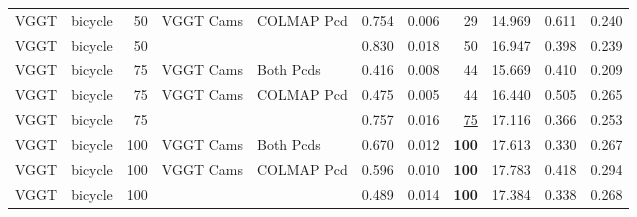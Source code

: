 \begin{table}[H]
\begin{tabular}{llrllrrrrrr}
VGGT & bicycle & 50 & VGGT Cams & COLMAP Pcd & 0.754 & 0.006 & 29 & 14.969 & 0.611 & 0.240 \\
VGGT & bicycle & 50 &  &  & 0.830 & 0.018 & 50 & 16.947 & 0.398 & 0.239 \\
VGGT & bicycle & 75 & VGGT Cams & Both Pcds & 0.416 & 0.008 & 44 & 15.669 & 0.410 & 0.209 \\
VGGT & bicycle & 75 & VGGT Cams & COLMAP Pcd & 0.475 & 0.005 & 44 & 16.440 & 0.505 & 0.265 \\
VGGT & bicycle & 75 &  &  & 0.757 & 0.016 & \underline{75} & 17.116 & 0.366 & 0.253 \\
VGGT & bicycle & 100 & VGGT Cams & Both Pcds & 0.670 & 0.012 & \textbf{100} & 17.613 & 0.330 & 0.267 \\
VGGT & bicycle & 100 & VGGT Cams & COLMAP Pcd & 0.596 & 0.010 & \textbf{100} & 17.783 & 0.418 & 0.294 \\
VGGT & bicycle & 100 &  &  & 0.489 & 0.014 & \textbf{100} & 17.384 & 0.338 & 0.268 \\
\bottomrule
\end{tabular}
\end{table}